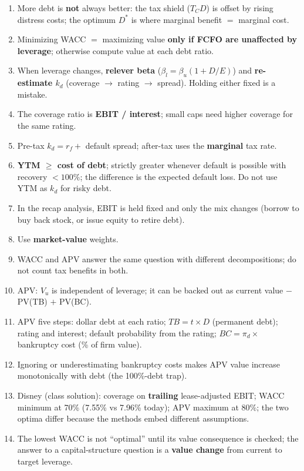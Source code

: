 \begin{trapbox}
\begin{enumerate}[leftmargin=*]
  \item More debt is \textbf{not} always better: the tax shield ($T_C D$) is offset by rising distress costs; the optimum $D^*$ is where marginal benefit $=$ marginal cost.
  \item Minimizing WACC $=$ maximizing value \textbf{only if FCFO are unaffected by leverage}; otherwise compute value at each debt ratio.
  \item When leverage changes, \textbf{relever beta} ($\beta_l=\beta_u(1+D/E)$) and \textbf{re-estimate $k_d$} (coverage $\to$ rating $\to$ spread). Holding either fixed is a mistake.
  \item The coverage ratio is \textbf{EBIT / interest}; small caps need higher coverage for the same rating.
  \item Pre-tax $k_d=r_f+$ default spread; after-tax uses the \textbf{marginal} tax rate.
  \item \textbf{YTM $\geq$ cost of debt}; strictly greater whenever default is possible with recovery $<100\%$; the difference is the expected default loss. Do not use YTM as $k_d$ for risky debt.
  \item In the recap analysis, EBIT is held fixed and only the mix changes (borrow to buy back stock, or issue equity to retire debt).
  \item Use \textbf{market-value} weights.
  \item WACC and APV answer the same question with different decompositions; do not count tax benefits in both.
  \item APV: $V_u$ is independent of leverage; it can be backed out as current value $-$ PV(TB) $+$ PV(BC).
  \item APV five steps: dollar debt at each ratio; $TB=t\times D$ (permanent debt); rating and interest; default probability from the rating; $BC=\pi_d\times$ bankruptcy cost (\% of firm value).
  \item Ignoring or underestimating bankruptcy costs makes APV value increase monotonically with debt (the 100\%-debt trap).
  \item Disney (class solution): coverage on \textbf{trailing} lease-adjusted EBIT; WACC minimum at 70\% (7.55\% vs 7.96\% today); APV maximum at 80\%; the two optima differ because the methods embed different assumptions.
  \item The lowest WACC is not ``optimal'' until its value consequence is checked; the answer to a capital-structure question is a \textbf{value change} from current to target leverage.
\end{enumerate}
\end{trapbox}

